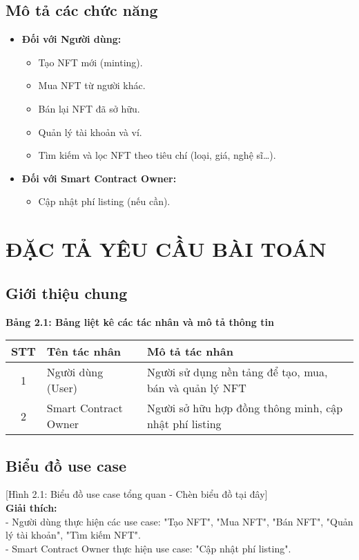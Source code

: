 \documentclass[a4paper,12pt]{report}
\begin{document}
\section{Mô tả các chức năng}
\begin{itemize}
    \item \textbf{Đối với Người dùng:}
    \begin{itemize}
        \item Tạo NFT mới (minting).
        \item Mua NFT từ người khác.
        \item Bán lại NFT đã sở hữu.
        \item Quản lý tài khoản và ví.
        \item Tìm kiếm và lọc NFT theo tiêu chí (loại, giá, nghệ sĩ\ldots).
    \end{itemize}
    \item \textbf{Đối với Smart Contract Owner:}
    \begin{itemize}
        \item Cập nhật phí listing (nếu cần).
    \end{itemize}
\end{itemize}

\chapter{ĐẶC TẢ YÊU CẦU BÀI TOÁN}

\section{Giới thiệu chung}
\textbf{Bảng 2.1: Bảng liệt kê các tác nhân và mô tả thông tin}
\begin{center}
\begin{tabular}{|c|l|p{8cm}|}
    \hline
    \textbf{STT} & \textbf{Tên tác nhân} & \textbf{Mô tả tác nhân} \\
    \hline
    1 & Người dùng (User) & Người sử dụng nền tảng để tạo, mua, bán và quản lý NFT \\
    \hline
    2 & Smart Contract Owner & Người sở hữu hợp đồng thông minh, cập nhật phí listing \\
    \hline
\end{tabular}
\end{center}

\section{Biểu đồ use case}
[Hình 2.1: Biểu đồ use case tổng quan - Chèn biểu đồ tại đây] \\
\textbf{Giải thích:} \\
- Người dùng thực hiện các use case: "Tạo NFT", "Mua NFT", "Bán NFT", "Quản lý tài khoản", "Tìm kiếm NFT". \\
- Smart Contract Owner thực hiện use case: "Cập nhật phí listing".
\end{document}
